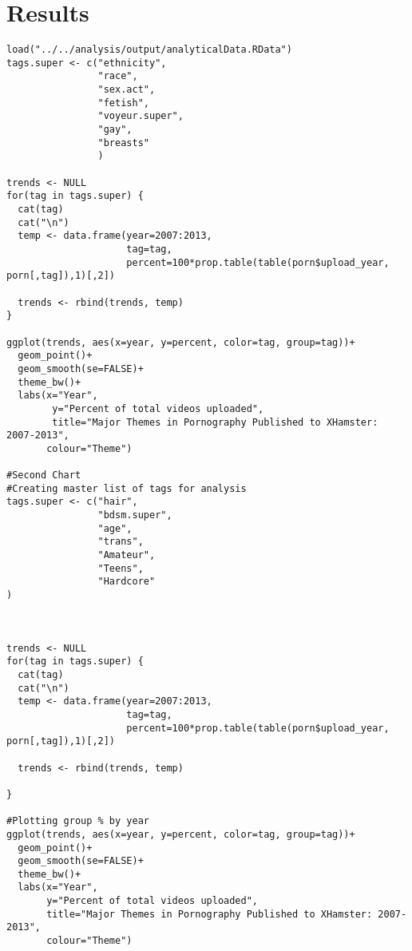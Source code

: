 \documentclass[11pt,]{article}
\begin{document}
\section{Results}\label{results}

\begin{verbatim}
load("../../analysis/output/analyticalData.RData")
tags.super <- c("ethnicity",
                "race",
                "sex.act",
                "fetish",
                "voyeur.super",
                "gay",
                "breasts" 
                )

trends <- NULL
for(tag in tags.super) {
  cat(tag)
  cat("\n")
  temp <- data.frame(year=2007:2013,
                     tag=tag,
                     percent=100*prop.table(table(porn$upload_year, porn[,tag]),1)[,2])
  
  trends <- rbind(trends, temp)
}

ggplot(trends, aes(x=year, y=percent, color=tag, group=tag))+
  geom_point()+
  geom_smooth(se=FALSE)+
  theme_bw()+
  labs(x="Year",
        y="Percent of total videos uploaded",
        title="Major Themes in Pornography Published to XHamster: 2007-2013",
       colour="Theme")

#Second Chart
#Creating master list of tags for analysis
tags.super <- c("hair",
                "bdsm.super",
                "age",
                "trans",
                "Amateur", 
                "Teens", 
                "Hardcore"
)



trends <- NULL
for(tag in tags.super) {
  cat(tag)
  cat("\n")
  temp <- data.frame(year=2007:2013,
                     tag=tag,
                     percent=100*prop.table(table(porn$upload_year, porn[,tag]),1)[,2])
  
  trends <- rbind(trends, temp)
  
}

#Plotting group % by year
ggplot(trends, aes(x=year, y=percent, color=tag, group=tag))+
  geom_point()+
  geom_smooth(se=FALSE)+
  theme_bw()+
  labs(x="Year",
       y="Percent of total videos uploaded",
       title="Major Themes in Pornography Published to XHamster: 2007-2013",
       colour="Theme")
\end{verbatim}
\end{document}
